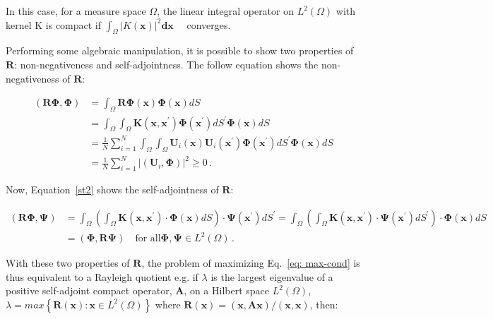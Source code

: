 \documentclass[12pt,a4paper]{article}
\newcommand{\bv}[1]{\mathbf{#1}}
\newcommand{\xp}{x^{\mathbf{\prime}}}
\begin{document}
In this case, for a measure space $\Omega$, the linear integral operator on $L^{2}(\Omega)$ with kernel K is compact if $\int_{\Omega} | K( \bv{x})|^2 \bv{dx} \quad$ converges.  

Performing some algebraic manipulation, it is possible to show two properties of $\bv{R}$: non-negativeness and self-adjointness. The follow equation shows the non-negativeness of $\bv{R}$:


\begin{equation}\label{st1}
 \begin{split}
 (\bv{R}\bv{\Phi},\bv{\Phi}) &= \int_{\Omega} \bv{R}\bv{\Phi}(\bv{x}) \bv{\Phi}(\bv{x}) dS \\
 &= \int_{\Omega} \int_{\Omega} \bv{K}(\bv{x},\bv{\xp}) \bv{\Phi}(\bv{\xp}) dS^{\prime} \bv{\Phi}(\bv{x}) dS \\
 &= \frac{1}{N} \sum_{i=1}^{N} \int_{\Omega} \int_{\Omega} \bv{U}_{i}(\bv{x}) \bv{U}_{i}(\bv{\xp}) \bv{\Phi}(\bv{\xp}) dS^{\prime} \bv{\Phi}(\bv{x}) dS \\
 &= \frac{1}{N} \sum_{i=1}^{N} | \left(\bv{U}_{i} , \bv{\Phi}\right) |^2 \ge 0 \,.
 \end{split}
\end{equation}


Now, Equation~\eqref{st2} shows the self-adjointness of $\bv{R}$:


\begin{equation}\label{st2}
 \begin{split}
 (\bv{R}\bv{\Phi},\bv{\Psi}) &= \int_{\Omega} \left (\int_{\Omega} \bv{K}(\bv{x},\bv{\xp}) \cdot \bv{\Phi}(\bv{x}) dS \right) \cdot \bv{\Psi}(\bv{\xp}) dS^{\prime} = 
\int_{\Omega} \left( \int_{\Omega} \bv{K}(\bv{x},\bv{\xp}) \cdot \bv{\Psi}(\bv{\xp}) dS^{\prime} \right) \cdot \bv{\Phi}(\bv{x}) dS \\
 &= (\bv{\Phi},\bv{R}\bv{\Psi}) \quad \text{for all} \bv{\Phi}, \bv{\Psi} \in L^{2}(\Omega) \,.
\end{split}
\end{equation}

With these two properties of $\bv{R}$, the problem of maximizing Eq.~\eqref{eq: max-cond} is thus equivalent to a Rayleigh quotient e.g. if $\lambda$ is the largest eigenvalue of a positive self-adjoint compact operator, $\bv{A}$, on a Hilbert space $L^2 (\Omega)$, $\lambda = max \left\lbrace \bv{R(x)} : \bv{x} \in L^2 (\Omega) \right\rbrace$ where $\bv{R(x)=(x,Ax)/(x,x)}$, then:
\end{document}
